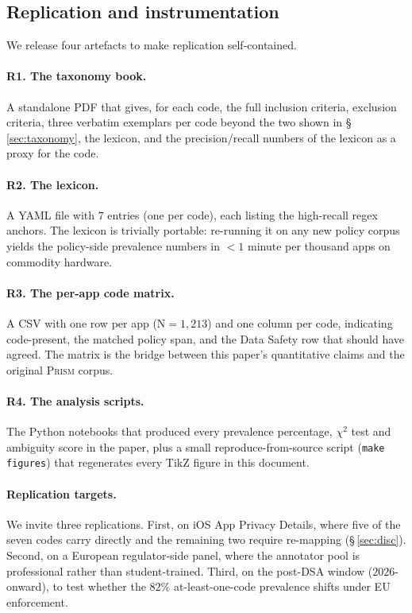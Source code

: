 \documentclass[11pt,a4paper]{article}
\newcommand{\prism}{\textsc{Prism}}
\begin{document}
\subsection{Replication and instrumentation}\label{sec:repl}

We release four artefacts to make replication self-contained.

\paragraph{R1. The taxonomy book.} A standalone PDF that gives, for
each code, the full inclusion criteria, exclusion criteria, three
verbatim exemplars per code beyond the two shown in
\S\,\ref{sec:taxonomy}, the lexicon, and the precision/recall numbers
of the lexicon as a proxy for the code.

\paragraph{R2. The lexicon.} A YAML file with $7$ entries (one per
code), each listing the high-recall regex anchors. The lexicon is
trivially portable: re-running it on any new policy corpus yields
the policy-side prevalence numbers in $<\!1$ minute per thousand
apps on commodity hardware.

\paragraph{R3. The per-app code matrix.} A CSV with one row per app
(N${=}1{,}213$) and one column per code, indicating
code-present, the matched policy span, and the Data Safety row that
should have agreed. The matrix is the bridge between this paper's
quantitative claims and the original \prism{} corpus.

\paragraph{R4. The analysis scripts.} The Python notebooks that
produced every prevalence percentage, $\chi^2$ test and ambiguity
score in the paper, plus a small reproduce-from-source script
(\texttt{make figures}) that regenerates every TikZ figure in this
document.

\paragraph{Replication targets.} We invite three replications. First,
on iOS App Privacy Details, where five of the seven codes carry
directly and the remaining two require re-mapping
(\S\,\ref{sec:disc}). Second, on a European regulator-side panel,
where the annotator pool is professional rather than student-trained.
Third, on the post-DSA window ($2026$-onward), to test whether the
$82\%$ at-least-one-code prevalence shifts under EU enforcement.
\end{document}
